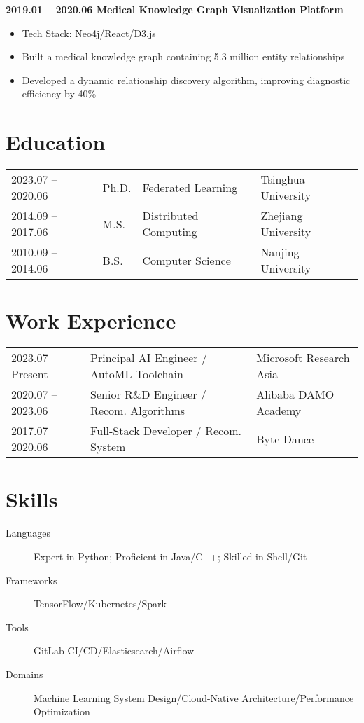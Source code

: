 \documentclass{cls/simplecv}
\begin{document}
\textbf{2019.01 -- 2020.06 \quad Medical Knowledge Graph Visualization Platform}
\begin{itemize}
	\item Tech Stack: Neo4j/React/D3.js
	\item Built a medical knowledge graph containing 5.3 million entity relationships
	\item Developed a dynamic relationship discovery algorithm, improving diagnostic efficiency by 40\%
\end{itemize}

\section{Education}

\begin{tabular}{llll}
	2023.07 -- 2020.06 & Ph.D. & Federated Learning & Tsinghua University \\
	2014.09 -- 2017.06 & M.S. & Distributed Computing & Zhejiang University\\
	2010.09 -- 2014.06 & B.S. & Computer Science & Nanjing University
\end{tabular}

\section{Work Experience}
\begin{tabular}{lll}
	2023.07 -- Present & Principal AI Engineer / AutoML Toolchain & Microsoft Research Asia \\
	2020.07 -- 2023.06 & Senior R\&D Engineer / Recom. Algorithms & Alibaba DAMO Academy\\
	2017.07 -- 2020.06 & Full-Stack Developer / Recom. System & Byte Dance\\
\end{tabular}

\section{Skills}

\begin{description}
	\item[Languages]  Expert in Python; Proficient in Java/C++; Skilled in Shell/Git
	\item[Frameworks] TensorFlow/Kubernetes/Spark
	\item[Tools] GitLab CI/CD/Elasticsearch/Airflow
	\item[Domains] Machine Learning System Design/Cloud-Native Architecture/Performance Optimization
\end{description}
\end{document}
